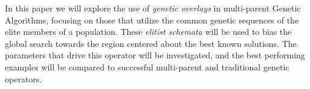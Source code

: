 In this paper we will explore the use of \emph{genetic overlays} in multi-parent Genetic Algorithms, focusing on those that utilize the common genetic sequences of the elite members of a population. These \emph{elitist schemata} will be used to bias the global search towards the region centered about the best known solutions. The parameters that drive this operator will be investigated, and the best performing examples will be compared to successful multi-parent and traditional genetic operators.
